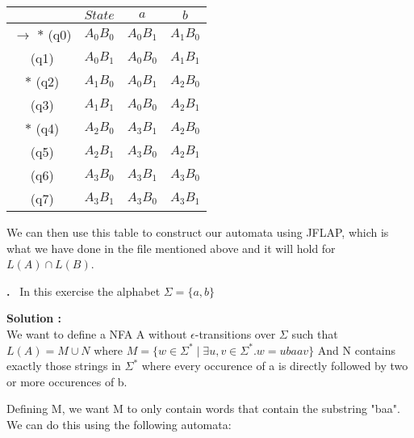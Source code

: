 \documentclass{article}
\newcounter{problem}
\newcounter{solution}
\newcommand\Problem{%
  \stepcounter{problem}%
  \textbf{\theproblem.}~%
  \setcounter{solution}{0}%
}
\newcommand\ASolution{%
  \stepcounter{solution}%
  \textbf{Solution \thesolution:}\\%
}
\begin{document}
\begin{table}[h!]
\centering
 \begin{tabular}{||c c c c||} 
 \hline
 & $State$ & $a$ & $b$ \\ [0.5ex] 
 \hline\hline
 $\rightarrow$ $*$ (q0) & $A_0B_0$ & $A_0B_1$ & $A_1B_0$ \\ 
    \hfill          (q1) & $A_0B_1$ & $A_0B_0$ & $A_1B_1$ \\
    \hfill $*$ (q2) & $A_1B_0$ & $A_0B_1$ & $A_2B_0$ \\
    \hfill           (q3) & $A_1B_1$ & $A_0B_0$ & $A_2B_1$\\
    \hfill $*$ (q4) & $A_2B_0$ & $A_3B_1$ & $A_2B_0$ \\
    \hfill           (q5) & $A_2B_1$ & $A_3B_0$ & $A_2B_1$ \\
    \hfill           (q6) & $A_3B_0$ & $A_3B_1$ & $A_3B_0$ \\
    \hfill           (q7) & $A_3B_1$ & $A_3B_0$ & $A_3B_1$ \\[1ex] 
 \hline
 \end{tabular}
\end{table}
\begin{center}
  We can then use this table to construct our automata using JFLAP, which is what we have done in the file mentioned above and it will hold for $L(A) \cap L(B)$.
\end{center} 
\newpage
\Problem In this exercise the alphabet $\Sigma = \{a,b\}$

\ASolution We want to define a NFA A without 
$\epsilon$-transitions over $\Sigma$ such that $L(A) = M \cup 
N$ where $M=\{w \in \Sigma^* \mid \exists u,v \in \Sigma^*. w =
ubaav\}$ And N contains exactly those strings in $\Sigma^*$ 
where every occurence of a is directly followed by two or more 
occurences of b.

Defining M, we want M to only contain words that contain the substring "baa". 
We can do this using the following automata:

\begin{center}
\end{center}
\end{document}
